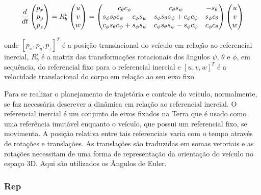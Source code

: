 \documentclass[a4paper, 12pt]{article}
\begin{document}
\begin{equation}
\centering
\frac { d }{ dt } 
\begin{pmatrix} 
	{ p }_{ x } \\ { p }_{ y } \\ { p }_{ z } 
\end{pmatrix} = 
{ R }_{ b }^{ v }\begin{pmatrix} { u } \\ { v } \\ { w } \end{pmatrix} =
\begin{pmatrix} 
	{ c }_{ \theta  }{ c }_{ \psi  } & { c }_{ \theta  }s_{ \psi  } & -{ s }_{ \theta  } \\ { s }_{ \phi  }{ s }_{ \theta  }{ c }_{ \psi  }-{ c }_{ \phi  }{ s }_{ \psi  } & { s }_{ \phi  }{ s }_{ \theta  }{ s }_{ \psi  }+{ c }_{ \phi  }{ c }_{ \psi  } & { s }_{ \phi  }{ c }_{ \theta  } \\ { c }_{ \phi  }{ s }_{ \theta  }{ c }_{ \psi  }+{ s }_{ \phi  }{ s }_{ \psi  } & { c }_{ \phi  }{ s }_{ \theta  }{ s }_{ \psi  }-{ s }_{ \phi  }{ c }_{ \psi  } & { c }_{ \phi  }{ c }_{ \theta  } 
\end{pmatrix}
\begin{pmatrix}
	{ u } \\ { v } \\ { w } 
\end{pmatrix}
\label{eq:cin1}
\end{equation}

\noindent onde $[p_x,p_y,p_z]^T$ é a posição translacional do veículo em relação ao referencial inercial, ${ R }_{ b }^{ i }$ é a matriz das transformações rotacionais dos ângulos $\psi$, $\theta$ e $\phi$, em sequência, do referencial fixo para o referencial inercial e $[u,v,w]^T$ é a velocidade translacional do corpo em relação ao seu eixo fixo.

Para se realizar o planejamento de trajetória e controle do veículo, normalmente, se faz necessária descrever a dinâmica em relação ao referencial inercial. O referencial inercial é um conjunto de eixos fixados na Terra que é usado como uma referência imutável enquanto o veículo, que possui um referencial fixo, se movimenta. A posição relativa entre tais referenciais varia com o tempo através de rotações e translações. As translações são traduzidas em somas vetoriais e as rotações necessitam de uma forma de representação da orientação do veículo no espaço 3D. Aqui são utilizados os Ângulos de Euler.

\subsubsection{Rep}
\end{document}

